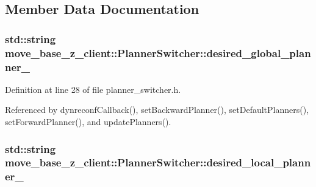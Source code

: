 \subsection{Member Data Documentation}
\subsubsection[{\texorpdfstring{desired\+\_\+global\+\_\+planner\+\_\+}{desired_global_planner_}}]{\setlength{\rightskip}{0pt plus 5cm}std\+::string move\+\_\+base\+\_\+z\+\_\+client\+::\+Planner\+Switcher\+::desired\+\_\+global\+\_\+planner\+\_\+\hspace{0.3cm}{\ttfamily [private]}}\hypertarget{classmove__base__z__client_1_1PlannerSwitcher_a004c15858f0a6b9abcd8211d58a7e34c}{}\label{classmove__base__z__client_1_1PlannerSwitcher_a004c15858f0a6b9abcd8211d58a7e34c}


Definition at line 28 of file planner\+\_\+switcher.\+h.



Referenced by dynreconf\+Callback(), set\+Backward\+Planner(), set\+Default\+Planners(), set\+Forward\+Planner(), and update\+Planners().

\subsubsection[{\texorpdfstring{desired\+\_\+local\+\_\+planner\+\_\+}{desired_local_planner_}}]{\setlength{\rightskip}{0pt plus 5cm}std\+::string move\+\_\+base\+\_\+z\+\_\+client\+::\+Planner\+Switcher\+::desired\+\_\+local\+\_\+planner\+\_\+\hspace{0.3cm}{\ttfamily [private]}}\hypertarget{classmove__base__z__client_1_1PlannerSwitcher_ae47bd6c9c70b27cddcb394f26bb9372d}{}\label{classmove__base__z__client_1_1PlannerSwitcher_ae47bd6c9c70b27cddcb394f26bb9372d}


